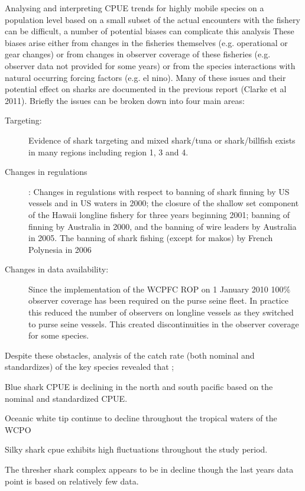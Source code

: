 Analysing and interpreting CPUE trends for highly mobile species on a population level based on a small subset of the actual encounters with the fishery can be difficult, a number of potential biases can complicate this analysis   These biases arise either from changes in the fisheries themselves (e.g. operational or gear changes) or from changes in observer coverage of these fisheries (e.g. observer data not provided for some years) or from the species interactions with natural occurring forcing factors (e.g. el nino).  Many of these issues and their potential effect on sharks are documented in the previous report (Clarke et al 2011).  %
Briefly the issues can be broken down into four main areas:
\begin{description}
\item[Targeting:] Evidence of shark targeting and mixed shark/tuna or shark/billfish  exists in many regions including region 1, 3 and 4. 
\item[Changes in regulations]: Changes in regulations with respect to banning of shark finning by US vessels and in US waters in 2000; the closure of the shallow set component of the Hawaii longline fishery for three years beginning 2001; banning of  finning by Australia in 2000, and the banning of wire leaders by Australia in 2005. The banning of shark fishing (except for makos) by French Polynesia in 2006
\item[Changes in data availability:] Since the implementation of the WCPFC ROP on 1 January 2010 100\% observer coverage has been required on the purse seine fleet. In practice this reduced the number of observers on longline vessels as they switched to purse seine vessels. This created discontinuities in the observer coverage for some species.
\end{description}
Despite these obstacles, analysis of the catch rate (both nominal and standardizes) of the key species revealed that ;

Blue shark CPUE is declining in the north and south pacific based on the nominal and standardized CPUE.

Oceanic white tip continue to decline throughout the tropical waters of the WCPO

Silky shark cpue exhibits high fluctuations throughout the study period.


The thresher shark complex appears to be in decline though the last years data point is based on relatively few data.

